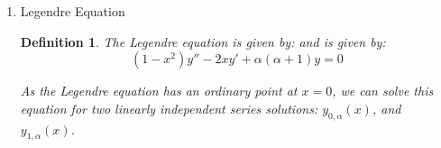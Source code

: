 \documentclass{article}
\newtheorem{definition}{Definition}[section]
\newtheorem{example}{Example}[section]
\begin{document}
\begin{enumerate}
\begin{example}
              $2a_{0} m (m-1) x^{m-1} + 3a_{0} m x^{m-1}$ is automatically satisfied,
              as it is the same with the indicial equation.

              Therefore, we have:
              \begin{eqnarray}
                  \left(
                  (n + 1 + m)(2(n + m) + 3)
                  \right) a_{n + 1}
                  + \left(
                  1 - 2(n + m)
                  \right) a_{n} &=& 0
              \end{eqnarray}

              As $m$ has two values, the general solution will depend on $a_0$ and $m$,
              and has a degeneracy of $2$.
          \end{example}
    \item Legendre Equation
          \begin{definition}
              The Legendre equation is given by:
              and is given by:
              \begin{equation}
                  (1-x^2) y'' - 2x y' + \alpha(\alpha+1) y = 0
                  \label{eq:legendre}
              \end{equation}

              As the Legendre equation has an ordinary point at $x = 0$,
              we can solve this equation for two linearly independent series solutions:
              $y_{0,\alpha}(x)$, and $y_{1,\alpha}(x)$.


\end{definition}
\end{enumerate}
\end{document}
